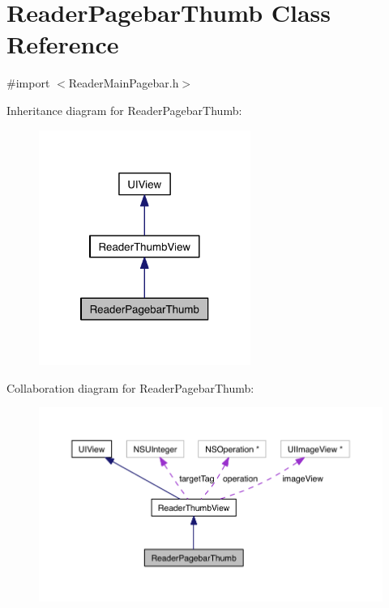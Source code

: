 \hypertarget{interface_reader_pagebar_thumb}{\section{Reader\-Pagebar\-Thumb Class Reference}
\label{dd/d65/interface_reader_pagebar_thumb}
}


{\ttfamily \#import $<$Reader\-Main\-Pagebar.\-h$>$}



Inheritance diagram for Reader\-Pagebar\-Thumb\-:
\nopagebreak
\begin{figure}[H]
\begin{center}
\leavevmode
\includegraphics[width=196pt]{d3/d4c/interface_reader_pagebar_thumb__inherit__graph}
\end{center}
\end{figure}


Collaboration diagram for Reader\-Pagebar\-Thumb\-:
\nopagebreak
\begin{figure}[H]
\begin{center}
\leavevmode
\includegraphics[width=350pt]{d3/d74/interface_reader_pagebar_thumb__coll__graph}
\end{center}
\end{figure}
